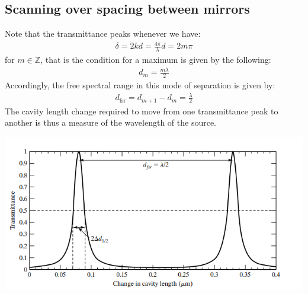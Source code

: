 \documentclass[11pt]{book}
\theoremstyle{break}
\theoremstyle{break}
\newcommand{\Z}{\mathbb{Z}}
\begin{document}
\subsection{Scanning over spacing between mirrors}
Note that the transmittance peaks whenever we have:
\begin{align*}
\delta = 2kd = \frac{4\pi}{\lambda}d= 2m \pi
\end{align*}
for $m \in \Z$, that is the condition for a maximum is given by the following:
\begin{align*}
d_m = \frac{m\lambda}{2}
\end{align*}
Accordingly, the free spectral range in this mode of separation is given by:
\begin{align*}
d_{\text{fsr}} = d_{m+1} - d_m = \frac{\lambda}{2}
\end{align*}
The cavity length change required to move from one transmittance peak to another is thus a measure of the wavelength of the source.
\begin{center}
\includegraphics[scale=0.95]{fsr2.png}
\end{center}
\end{document}
